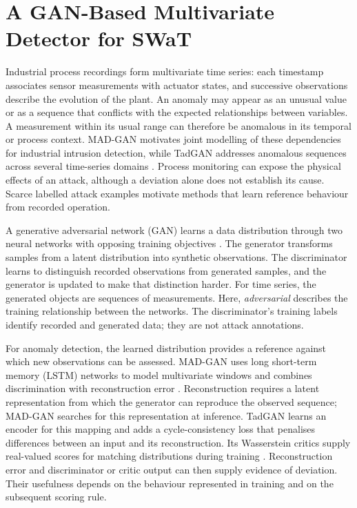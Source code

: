 \section{A GAN-Based Multivariate Detector for SWaT}
\label{sec:anomaly:gan}

Industrial process recordings form multivariate time series: each timestamp associates sensor
measurements with actuator states, and successive observations describe the evolution of the
plant. An anomaly may appear as an unusual value or as a sequence that conflicts with the
expected relationships between variables. A measurement within its usual range can therefore
be anomalous in its temporal or process context. MAD-GAN motivates joint modelling of these
dependencies for industrial intrusion detection, while TadGAN addresses anomalous sequences
across several time-series domains \cite{li2019madgan,geiger2020tadgan}. Process monitoring can
expose the physical effects of an attack, although a deviation alone does not establish its
cause. Scarce labelled attack examples motivate methods that learn reference behaviour from
recorded operation.

A generative adversarial network (GAN) learns a data distribution through two neural networks
with opposing training objectives \cite{goodfellow2014generative}. The generator transforms
samples from a latent distribution into synthetic observations. The discriminator learns to
distinguish recorded observations from generated samples, and the generator is updated to make
that distinction harder. For time series, the generated objects are sequences of measurements.
Here, \emph{adversarial} describes the training relationship between the networks. The
discriminator's training labels identify recorded and generated data; they are not attack
annotations.

For anomaly detection, the learned distribution provides a reference against which new
observations can be assessed. MAD-GAN uses long short-term memory (LSTM) networks to model
multivariate windows and combines discrimination with reconstruction error
\cite{li2019madgan}. Reconstruction requires a latent representation from which the generator
can reproduce the observed sequence; MAD-GAN searches for this representation at inference.
TadGAN learns an encoder for this mapping and adds a cycle-consistency loss that penalises
differences between an input and its reconstruction. Its Wasserstein critics supply real-valued
scores for matching distributions during training \cite{geiger2020tadgan}. Reconstruction error
and discriminator or critic output can then supply evidence of deviation. Their usefulness
depends on the behaviour represented in training and on the subsequent scoring rule.

